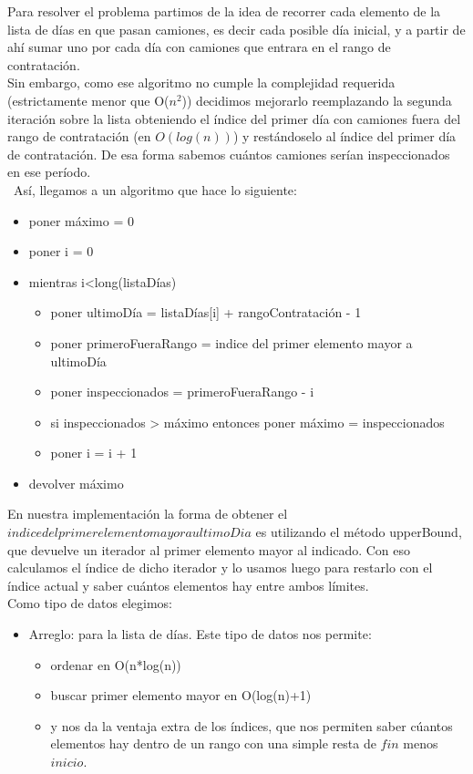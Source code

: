Para resolver el problema partimos de la idea de recorrer cada elemento de la lista de d\'ias en que pasan camiones, es decir cada posible d\'ia inicial, y a partir de ah\'i sumar uno por cada d\'ia con camiones que entrara en el rango de contrataci\'on.\\
Sin embargo, como ese algoritmo no cumple la complejidad requerida (estrictamente menor que O($n^2$)) decidimos mejorarlo reemplazando la segunda iteraci\'on sobre la lista obteniendo el \'indice del primer d\'ia con camiones fuera del rango de contrataci\'on (en $O(log(n))$) y rest\'andoselo al \'indice del primer d\'ia de contrataci\'on. De esa forma sabemos cu\'antos camiones ser\'ian inspeccionados en ese per\'iodo.\\\
As\'i, llegamos a un algoritmo que hace lo siguiente:
\begin{itemize}
\item poner m\'aximo = 0
\item poner i = 0
\item mientras i<long(listaD\'ias)
\begin{itemize}
	\item poner ultimoD\'ia = listaD\'ias[i] + rangoContrataci\'on - 1
	\item poner primeroFueraRango = indice del primer elemento mayor a ultimoD\'ia
	\item poner inspeccionados = primeroFueraRango - i
	\item si inspeccionados > m\'aximo entonces poner m\'aximo = inspeccionados
	\item poner i = i + 1
\end{itemize}
\item devolver m\'aximo
\end{itemize}

En nuestra implementaci\'on la forma de obtener el $indice del primer elemento mayor a ultimoDia$ es utilizando el m\'etodo upperBound, que devuelve un iterador al primer elemento mayor al indicado. Con eso calculamos el \'indice de dicho iterador y lo usamos luego para restarlo con el \'indice actual y saber cu\'antos elementos hay entre ambos l\'imites.\\

Como tipo de datos elegimos:
\begin{itemize}
\item Arreglo: para la lista de d\'ias. Este tipo de datos nos permite: 
\begin{itemize}
 \item ordenar en O(n*log(n))
 \item buscar primer elemento mayor en O(log(n)+1)
 \item y nos da la ventaja extra de los \'indices, que nos permiten saber c\'uantos elementos hay dentro de un rango con una simple resta de $fin$ menos $inicio$.
\end{itemize}
\end{itemize}

